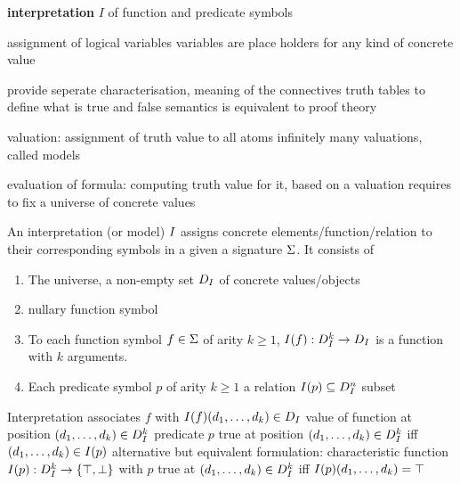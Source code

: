             \textbf{interpretation} $I$ of function and predicate symbols

            assignment of logical variables
            variables are place holders for any kind of concrete value

            provide seperate characterisation, meaning of the connectives
            truth tables
            to define what is true and false
            semantics is equivalent to proof theory

            valuation: assignment of truth value to all atoms
            infinitely many valuations, called models

            evaluation of formula: computing truth value for it, based on a valuation
            requires to fix a universe of concrete values

            \begin{definition}[Interpretation]
                An interpretation (or model) $I$ assigns concrete elements/function/relation to their corresponding symbols in a given a signature $\Sigma$. It consists of
                \begin{enumerate}
                    \item The universe, a non-empty set $D_{I}$ of concrete values/objects
                    \item nullary function symbol
                    \item To each function symbol $f\in\Sigma$ of arity $k\geq 1$, $I(f):D_{I}^k\rightarrow D_{I}$ is a function with $k$ arguments.
                    \item Each predicate symbol $p$ of arity $k\geq 1$ a relation $I(p)\subseteq D_{I}^n$ subset
                \end{enumerate}

            \end{definition}

            Interpretation associates $f$ with $I(f)(d_1,\ldots,d_k)\in D_{I}$ value of function at position $(d_1,\ldots,d_k)\in D_{I}^k $
            predicate $p$ true at position $(d_1,\ldots,d_k)\in D_{I}^k$ iff $(d_1,\ldots,d_k)\in I(p)$
            alternative but equivalent formulation: characteristic function $I(p):D_{I}^k\rightarrow\{\top,\bot\}$ with $p$ true at $(d_1,\ldots,d_k)\in D_{I}^k$ iff $I(p)(d_1,\ldots,d_k)=\top$

